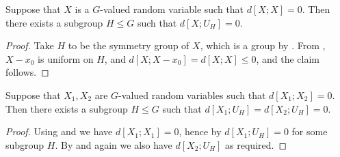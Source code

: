 \begin{lemma}\label{lem:100pc-self}
  \leanok
  Suppose that $X$ is a $G$-valued random variable such that
  $d[X ;X]=0$. Then there exists a subgroup $H \leq G$ such that $d[X ;U_H] = 0$.
\end{lemma}

\begin{proof}\leanok
Take $H$ to be the symmetry group of $X$, which is a group by . From , $X-x_0$ is uniform on $H$, and $d[X ;X-x_0] = d[X ;X] \leq 0$, and the claim follows.
\end{proof}

\begin{corollary}\label{lem:100pc}
  \leanok
  Suppose that $X_1,X_2$ are $G$-valued random variables such that
  $d[X_1;X_2]=0$. Then there exists a subgroup $H \leq G$ such that $d[X_1;U_H] = d[X_2;U_H] = 0$.
\end{corollary}

\begin{proof}\leanok
Using  and  we have $d[X_1;X_1]=0$, hence by  $d[X_1;U_H]=0$ for some subgroup $H$.  By  and  again we also have $d[X_2;U_H]$ as required.
\end{proof}
